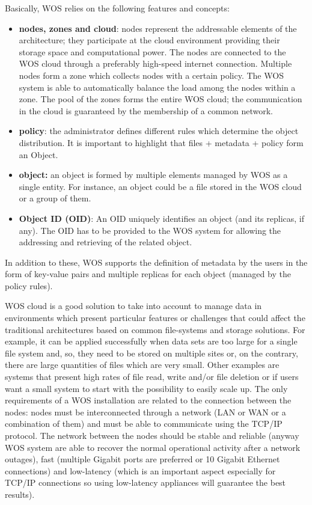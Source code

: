 Basically, WOS relies on the following features and concepts:
\begin{itemize}
\item \textbf{nodes, zones and cloud}: nodes represent the addressable elements of the architecture; they participate at the cloud environment providing their storage space and computational power.
The nodes are connected to the WOS cloud through a preferably high-speed internet connection.
Multiple nodes form a zone which collects nodes with a certain policy. The WOS system is able to automatically balance the load among the nodes within a zone.
The pool of the zones forms the entire WOS cloud; the communication in the cloud is guaranteed by the membership of a common network.
\item \textbf{policy}: the administrator defines different rules which determine the object distribution. It is important to highlight that files + metadata + policy form an Object.
\item \textbf{object:} an object is formed by multiple elements managed by WOS as a single entity. For instance, an object could be a file stored in the WOS cloud or a group of them.
\item \textbf{Object ID (OID)}: An OID uniquely identifies an object (and its replicas, if any). The OID has to be provided to the WOS system for allowing the addressing and retrieving of the related object.
\end{itemize}
In addition to these, WOS supports the definition of metadata by the users in the form of key-value pairs and multiple replicas for each object (managed by the policy rules).

WOS cloud is a good solution to take into account to manage data in environments which present particular features or challenges that could affect the traditional architectures based on common file-systems and storage solutions.
For example, it can be applied successfully when data sets are too large for a single file system and, so, they need to be stored on multiple sites or, on the contrary, there are large quantities of files which are very small.
Other examples are systems that present high rates of file read, write and/or file deletion or if users want a small system to start with the possibility to easily scale up.
The only requirements of a WOS installation are related to the connection between the nodes: nodes must be interconnected through a network (LAN or WAN or a combination of them) and must be able to communicate using the TCP/IP protocol.
The network between the nodes should be stable and reliable (anyway WOS system are able to recover the normal operational activity after a network outages), fast (multiple Gigabit ports are preferred or 10 Gigabit Ethernet connections) and low-latency (which is an important aspect especially for TCP/IP connections so using low-latency appliances will guarantee the best results).

